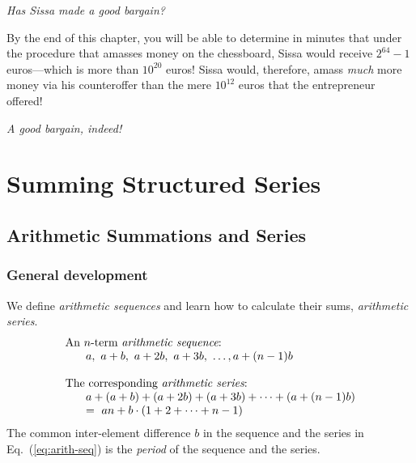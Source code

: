 \medskip

\noindent
{\em Has Sissa made a good bargain?}

\medskip

\noindent
By the end of this chapter, you will be able to determine in minutes that under the procedure that amasses money on the chessboard, Sissa would receive $2^{64} -1$ euros---which is more than $10^{20}$ euros!  Sissa would, therefore, amass {\em much} more money via his counteroffer than the mere $10^{12}$ euros that the entrepreneur offered!

\noindent
{\em A good bargain, indeed!}



\section{Summing Structured Series}
\label{sec:structured-series}

\subsection{Arithmetic Summations and Series}
\label{sec:arithmetic-series}

\subsubsection{General development}

We define {\it arithmetic sequences} and learn how to calculate their sums, {\it arithmetic series}.
 
 
\begin{equation}
\label{eq:arith-seq}
\begin{array}{l}
\mbox{An $n$-term {\em arithmetic sequence}:} \\
\hspace*{.25in}a, \ a+b, \ a+2b, \ a+3b, \ \ldots, a+(n-1)b \\
  \\
\mbox{The corresponding {\em arithmetic series}:} \\
\hspace*{.25in}a + (a+b) + (a+2b) + (a+3b) + \cdots + (a+(n-1)b) \\
\hspace*{.25in} = \
an + b \cdot (1 + 2 + \cdots + n-1)
\end{array}
\end{equation}
The common inter-element difference $b$ in the sequence and the series in Eq.~(\ref{eq:arith-seq}) is the {\it period} of the sequence and the series.

